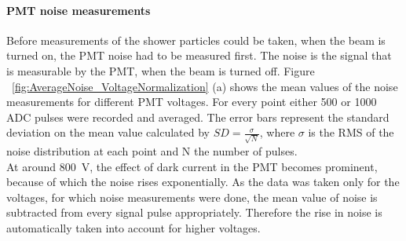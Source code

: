 \paragraph{PMT noise measurements}
Before measurements of the shower particles could be taken, when the beam is turned on, the PMT noise had to be measured first.
The noise is the signal that is measurable by the PMT, when the beam is turned off.
Figure ~\ref{fig:AverageNoise_VoltageNormalization} (a) shows the mean values of the noise measurements for different PMT voltages. 
For every point either 500 or 1000 ADC pulses were recorded and averaged.
The error bars represent the standard deviation on the mean value calculated by $SD=\frac{\sigma}{\sqrt{N}}$, where $\sigma$ is the RMS of the noise distribution at each point and N the number of pulses.\\
At around \SI{800}{\volt}, the effect of dark current in the PMT becomes prominent, because of which the noise rises exponentially.
As the data was taken only for the voltages, for which noise measurements were done, the mean value of noise is subtracted from every signal pulse appropriately. 
Therefore the rise in noise is automatically taken into account for higher voltages.
